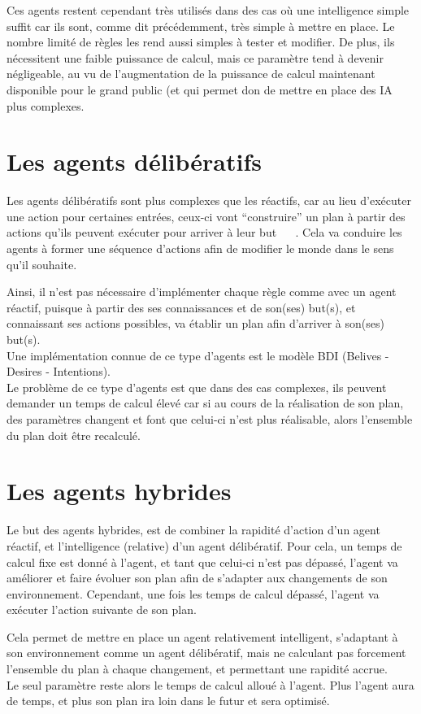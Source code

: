 \documentclass[asi]{picINSA}
\begin{document}
Ces agents restent cependant très utilisés dans des cas où une intelligence simple suffit car ils sont, comme dit précédemment, très simple à mettre en place. Le nombre limité de règles les rend aussi simples à tester et modifier.
De plus, ils nécessitent une faible puissance de calcul, mais ce paramètre tend à devenir négligeable, au vu de l'augmentation de la puissance de calcul maintenant disponible pour le grand public (et qui permet don de mettre en place des IA plus complexes.

\section{Les agents délibératifs}
Les agents délibératifs sont plus complexes que les réactifs, car au lieu d'exécuter une action pour certaines entrées, ceux-ci vont ``construire'' un plan à partir des actions qu'ils peuvent exécuter pour arriver à leur but ~\cite{IntelAgents4CompGames} ~\cite{IntelAgentsInCompGames}. Cela va conduire les agents à former une séquence d'actions afin de modifier le monde dans le sens qu'il souhaite.

Ainsi, il n'est pas nécessaire d'implémenter chaque règle comme avec un agent réactif, puisque à partir des ses connaissances et de son(ses) but(s), et connaissant ses actions possibles, va établir un plan afin d'arriver à son(ses) but(s).\\
Une implémentation connue de ce type d'agents est le modèle BDI (Belives - Desires - Intentions).\\
Le problème de ce type d'agents est que dans des cas complexes, ils peuvent demander un temps de calcul élevé car si au cours de la réalisation de son plan, des paramètres changent et font que celui-ci n'est plus réalisable, alors l'ensemble du plan doit être recalculé.

\section{Les agents hybrides}
Le but des agents hybrides, est de combiner la rapidité d'action d'un agent réactif, et l'intelligence (relative) d'un agent délibératif.
Pour cela, un temps de calcul fixe est donné à l'agent, et tant que celui-ci n'est pas dépassé, l'agent va améliorer et faire évoluer son plan afin de s'adapter aux changements de son environnement. Cependant, une fois les temps de calcul dépassé, l'agent va exécuter l'action suivante de son plan.

Cela permet de mettre en place un agent relativement intelligent, s'adaptant à son environnement comme un agent délibératif, mais ne calculant pas forcement l'ensemble du plan à chaque changement, et permettant une rapidité accrue.\\
Le seul paramètre reste alors le temps de calcul alloué à l'agent. Plus l'agent aura de temps, et plus son plan ira loin dans le futur et sera optimisé.
\end{document}
